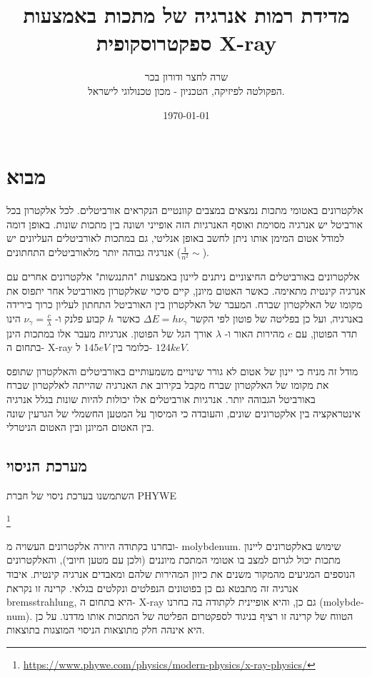 \documentclass{article}
\title{
	מדידת רמות אנרגיה של מתכות באמצעות ספקטרוסקופית
	\textenglish{X-ray}
}
\author{
שרה לחצר ודורון בכר \\
הפקולטה לפיזיקה, הטכניון - מכון טכנולוגי לישראל.
}
\date{\today}
\begin{document}
\maketitle

\begin{abstract}
\end{abstract}
\section{מבוא}

אלקטרונים באטומי מתכות נמצאים במצבים קוונטיים הנקראים אורביטלים. לכל אלקטרון בכל אורביטל יש אנרגיה מסוימת ואוסף האנרגיות הזה אופייני ושונה בין מתכות שונות. באופן דומה למודל אטום המימן אותו ניתן לחשב באופן אנליטי, גם במתכות לאורביטלים העליונים יש אנרגיה גבוהה יותר מלאורביטלים התחתונים
($\frac{1}{n^2}\sim$).

אלקטרונים באורביטלים החיצוניים ניתנים ליינון באמצעות
"התנגשות"
אלקטרונים אחרים עם אנרגיה קינטית מתאימה. כאשר האטום מיונן, קיים סיכוי שאלקטרון מאורביטל אחר יתפוס את מקומו של האלקטרון שברח. המעבר של האלקטרון בין האורביטל התחתון לעליון כרוך בירידה באנרגיה, ועל כן בפליטה של פוטון לפי הקשר
$\Delta E = h \nu_{\gamma}$
כאשר
$h$
קבוע פלנק
ו-
$\nu_{\gamma} = \frac{c}{\lambda}$
הינו תדר הפוטון, עם
$c$
מהירות האור ו-
$\lambda$
אורך הגל של הפוטון. אנרגיות מעבר אלו במתכות הינן בתחום ה-
\textenglish{X-ray}
כלומר בין
$145 eV$
ל-
$124 keV$.

מודל זה מניח כי יינון של אטום לא גורר שינויים משמעותיים באורביטלים והאלקטרון שתופס את מקומו של האלקטרון שברח מקבל בקירוב את האנרגיה שהייתה לאלקטרון שברח באורביטל הגבוהה יותר. אנרגיות אורביטלים אלו יכולות להיות שונות בגלל אנרגיה אינטראקציה בין אלקטרונים שונים, והעובדה כי המיסוך על המטען החשמלי של הגרעין שונה בין האטום המיונן ובין האטום הניטרלי.

\subsection{מערכת הניסוי}

השתמשנו בערכת ניסוי של חברת
\textenglish{PHYWE}\begin{english}\footnote{\url{https://www.phywe.com/physics/modern-physics/x-ray-physics/}}\end{english}
ובחרנו בקתודה היורה אלקטרונים העשויה מ-
\textenglish{molybdenum}. שימוש באלקטרונים ליינון מתכות יכול לגרום למצב בו אטומי המתכת מיוננים (ולכן עם מטען חיובי), והאלקטרונים הנוספים המגיעים מהמקור משנים את כיוון המהירות שלהם ומאבדים אנרגיה קינטית. איבוד אנרגיה זה מתבטא גם כן בפוטונים הנפלטים ונקלטים בגלאי. קרינה זו נקראת
\textenglish{bremsstrahlung},
היא בתחום ה-
\textenglish{X-ray}
גם כן,
והיא אופיינית לקתודה בה בחרנו
(\textenglish{molybdenum}).
הטווח של קרינה זו רציף בניגוד לספקטרום הפליטה של המתכות אותו מדדנו. על כן היא אינהה חלק מתוצאות הניסוי המוצגות בתוצאות.
\end{document}
